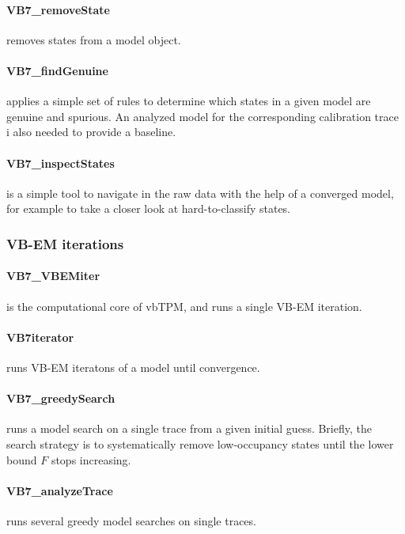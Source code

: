 \paragraph{VB7\_removeState}
removes states from a model object.
\paragraph{VB7\_findGenuine}
applies a simple set of rules to determine which states in a given
model are genuine and spurious. An analyzed model for the
corresponding calibration trace i also needed to provide a baseline.
\paragraph{VB7\_inspectStates} 
is a simple tool to navigate in the raw data with the help of a
converged model, for example to take a closer look at hard-to-classify
states.

\subsubsection{VB-EM iterations}
\paragraph{VB7\_VBEMiter} 
is the computational core of vbTPM, and runs a single VB-EM iteration.
\paragraph{VB7iterator} 
runs VB-EM iteratons of a model until convergence.
\paragraph{VB7\_greedySearch}
runs a model search on a single trace from a given initial
guess. Briefly, the search strategy is to systematically remove
low-occupancy states until the lower bound $F$ stops increasing.
\paragraph{VB7\_analyzeTrace}
runs several greedy model searches on single traces. 


